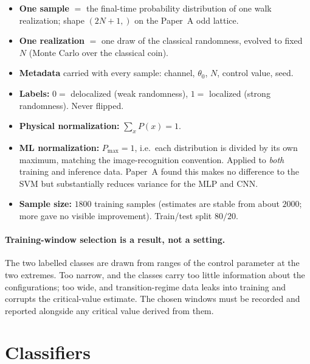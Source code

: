 \documentclass[11pt]{article}
\begin{document}
\begin{itemize}
  \item \textbf{One sample} $=$ the final-time probability distribution of one
        walk realization; shape $(2N+1,)$ on the Paper~A odd lattice.
  \item \textbf{One realization} $=$ one draw of the classical randomness,
        evolved to fixed $N$ (Monte Carlo over the classical coin).
  \item \textbf{Metadata} carried with every sample: channel, $\theta_0$, $N$,
        control value, seed.
  \item \textbf{Labels:} $0 = $ delocalized (weak randomness),
        $1 = $ localized (strong randomness). Never flipped.
  \item \textbf{Physical normalization:} $\sum_x P(x) = 1$.
  \item \textbf{ML normalization:} $P_{\max} = 1$, i.e.\ each distribution is
        divided by its own maximum, matching the image-recognition
        convention. Applied to \emph{both} training and inference data.
        Paper~A found this makes no difference to the SVM but substantially
        reduces variance for the MLP and CNN.
  \item \textbf{Sample size:} $1800$ training samples (estimates are stable
        from about $2000$; more gave no visible improvement).
        Train/test split $80/20$.
\end{itemize}

\paragraph{Training-window selection is a result, not a setting.}
The two labelled classes are drawn from ranges of the control parameter at
the two extremes. Too narrow, and the classes carry too little information
about the configurations; too wide, and transition-regime data leaks into
training and corrupts the critical-value estimate. The chosen windows must be
recorded and reported alongside any critical value derived from them.

\section{Classifiers}
\label{sec:classifiers}
\end{document}
